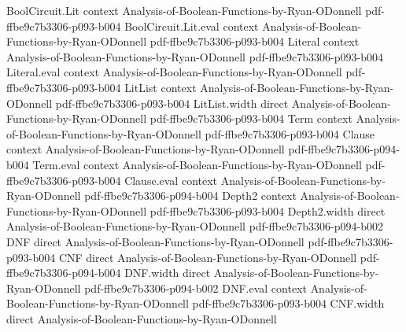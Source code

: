 \begin{theorem}
\leanok
{}
\proofstep
  {BoolCircuit.Lit}
  {context}
  {Analysis-of-Boolean-Functions-by-Ryan-ODonnell}
  {pdf-ffbe9c7b3306-p093-b004}
\proofstep
  {BoolCircuit.Lit.eval}
  {context}
  {Analysis-of-Boolean-Functions-by-Ryan-ODonnell}
  {pdf-ffbe9c7b3306-p093-b004}
\proofstep
  {Literal}
  {context}
  {Analysis-of-Boolean-Functions-by-Ryan-ODonnell}
  {pdf-ffbe9c7b3306-p093-b004}
\proofstep
  {Literal.eval}
  {context}
  {Analysis-of-Boolean-Functions-by-Ryan-ODonnell}
  {pdf-ffbe9c7b3306-p093-b004}
\proofstep
  {LitList}
  {context}
  {Analysis-of-Boolean-Functions-by-Ryan-ODonnell}
  {pdf-ffbe9c7b3306-p093-b004}
\proofstep
  {LitList.width}
  {direct}
  {Analysis-of-Boolean-Functions-by-Ryan-ODonnell}
  {pdf-ffbe9c7b3306-p093-b004}
\proofstep
  {Term}
  {context}
  {Analysis-of-Boolean-Functions-by-Ryan-ODonnell}
  {pdf-ffbe9c7b3306-p093-b004}
\proofstep
  {Clause}
  {context}
  {Analysis-of-Boolean-Functions-by-Ryan-ODonnell}
  {pdf-ffbe9c7b3306-p094-b004}
\proofstep
  {Term.eval}
  {context}
  {Analysis-of-Boolean-Functions-by-Ryan-ODonnell}
  {pdf-ffbe9c7b3306-p093-b004}
\proofstep
  {Clause.eval}
  {context}
  {Analysis-of-Boolean-Functions-by-Ryan-ODonnell}
  {pdf-ffbe9c7b3306-p094-b004}
\proofstep
  {Depth2}
  {context}
  {Analysis-of-Boolean-Functions-by-Ryan-ODonnell}
  {pdf-ffbe9c7b3306-p093-b004}
\proofstep
  {Depth2.width}
  {direct}
  {Analysis-of-Boolean-Functions-by-Ryan-ODonnell}
  {pdf-ffbe9c7b3306-p094-b002}
\proofstep
  {DNF}
  {direct}
  {Analysis-of-Boolean-Functions-by-Ryan-ODonnell}
  {pdf-ffbe9c7b3306-p093-b004}
\proofstep
  {CNF}
  {direct}
  {Analysis-of-Boolean-Functions-by-Ryan-ODonnell}
  {pdf-ffbe9c7b3306-p094-b004}
\proofstep
  {DNF.width}
  {direct}
  {Analysis-of-Boolean-Functions-by-Ryan-ODonnell}
  {pdf-ffbe9c7b3306-p094-b002}
\proofstep
  {DNF.eval}
  {context}
  {Analysis-of-Boolean-Functions-by-Ryan-ODonnell}
  {pdf-ffbe9c7b3306-p093-b004}
\proofstep
  {CNF.width}
  {direct}
  {Analysis-of-Boolean-Functions-by-Ryan-ODonnell}

\end{theorem}
